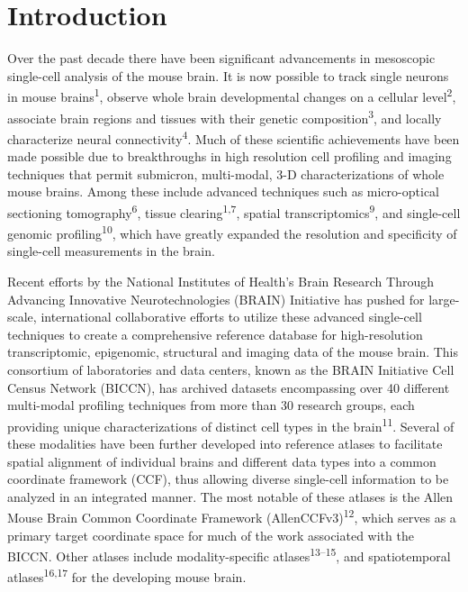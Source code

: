 \documentclass[
  12pt,
]{article}
\begin{document}
\section{Introduction}\label{introduction}

Over the past decade there have been significant advancements in
mesoscopic single-cell analysis of the mouse brain. It is now possible
to track single neurons in mouse brains\textsuperscript{1}, observe
whole brain developmental changes on a cellular
level\textsuperscript{2}, associate brain regions and tissues with their
genetic composition\textsuperscript{3}, and locally characterize neural
connectivity\textsuperscript{4}. Much of these scientific achievements
have been made possible due to breakthroughs in high resolution cell
profiling and imaging techniques that permit submicron, multi-modal, 3-D
characterizations of whole mouse brains. Among these include advanced
techniques such as micro-optical sectioning
tomography\textsuperscript{6}, tissue clearing\textsuperscript{1,7},
spatial transcriptomics\textsuperscript{9}, and single-cell genomic
profiling\textsuperscript{10}, which have greatly expanded the
resolution and specificity of single-cell measurements in the brain.

Recent efforts by the National Institutes of Health's Brain Research
Through Advancing Innovative Neurotechnologies (BRAIN) Initiative has
pushed for large-scale, international collaborative efforts to utilize
these advanced single-cell techniques to create a comprehensive
reference database for high-resolution transcriptomic, epigenomic,
structural and imaging data of the mouse brain. This consortium of
laboratories and data centers, known as the BRAIN Initiative Cell Census
Network (BICCN), has archived datasets encompassing over 40 different
multi-modal profiling techniques from more than 30 research groups, each
providing unique characterizations of distinct cell types in the
brain\textsuperscript{11}. Several of these modalities have been further
developed into reference atlases to facilitate spatial alignment of
individual brains and different data types into a common coordinate
framework (CCF), thus allowing diverse single-cell information to be
analyzed in an integrated manner. The most notable of these atlases is
the Allen Mouse Brain Common Coordinate Framework
(AllenCCFv3)\textsuperscript{12}, which serves as a primary target
coordinate space for much of the work associated with the BICCN. Other
atlases include modality-specific atlases\textsuperscript{13--15}, and
spatiotemporal atlases\textsuperscript{16,17} for the developing mouse
brain.
\end{document}
